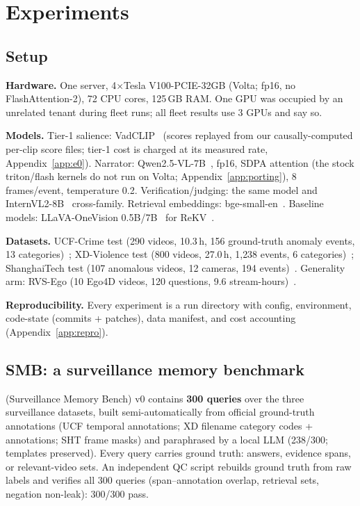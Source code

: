 \section{Experiments}
\label{sec:exp}

\subsection{Setup}
\label{sec:exp-setup}

\textbf{Hardware.} One server, 4$\times$Tesla V100-PCIE-32GB (Volta; fp16, no FlashAttention-2), 72 CPU cores, 125\,GB RAM. One GPU was occupied by an unrelated tenant during fleet runs; all fleet results use 3 GPUs and say so.

\textbf{Models.} Tier-1 salience: VadCLIP~\cite{vadclip} (scores replayed from our causally-computed per-clip score files; tier-1 cost is charged at its measured rate, Appendix~\ref{app:e0}). Narrator: Qwen2.5-VL-7B~\cite{qwen25vl}, fp16, SDPA attention (the stock triton/flash kernels do not run on Volta; Appendix~\ref{app:porting}), 8 frames/event, temperature 0.2. Verification/judging: the same model and InternVL2-8B~\cite{internvl} cross-family. Retrieval embeddings: bge-small-en~\cite{bge}. Baseline models: LLaVA-OneVision 0.5B/7B~\cite{llavaov} for ReKV~\cite{rekv}.

\textbf{Datasets.} UCF-Crime test (290 videos, 10.3\,h, 156 ground-truth anomaly events, 13 categories)~\cite{ucfcrime}; XD-Violence test (800 videos, 27.0\,h, 1{,}238 events, 6 categories)~\cite{xdviolence}; ShanghaiTech test (107 anomalous videos, 12 cameras, 194 events)~\cite{shanghaitech}. Generality arm: RVS-Ego (10 Ego4D videos, 120 questions, 9.6 stream-hours)~\cite{flashvstream}.

\textbf{Reproducibility.} Every experiment is a run directory with config, environment, code-state (commits + patches), data manifest, and cost accounting (Appendix~\ref{app:repro}).

\subsection{SMB: a surveillance memory benchmark}
\label{sec:exp-smb}

\smb (Surveillance Memory Bench) v0 contains \textbf{300 queries} over the three surveillance datasets, built semi-automatically from official ground-truth annotations (UCF temporal annotations; XD filename category codes + annotations; SHT frame masks) and paraphrased by a local LLM (238/300; templates preserved). Every query carries ground truth: answers, evidence spans, or relevant-video sets. An independent QC script rebuilds ground truth from raw labels and verifies all 300 queries (span--annotation overlap, retrieval sets, negation non-leak): 300/300 pass.

